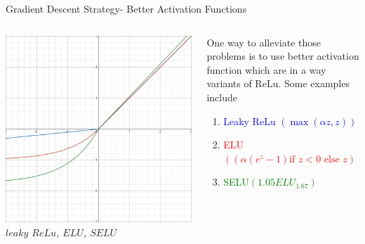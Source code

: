 \begin{frame}{Gradient Descent Strategy- Better Activation Functions}
	\begin{columns}[T]
        \begin{column}{0.5\textwidth}
        	\includegraphics[width=\textwidth]{images/SELU.png}
        	\tiny{\textit{$leaky$ $ReLu$, $ELU$, $SELU$}}
        \end{column}
	    \begin{column}{0.5\textwidth}
    	    One way to alleviate those problems is to use better activation function which are in a way variants of ReLu. Some examples include 
			\begin{enumerate}[$\bullet$]
				\item \textcolor{blue}{Leaky ReLu $\left(\max(\alpha z,z)\right)$}
				\item \textcolor{red}{ELU$\left((\alpha (e^z-1)\text{if $z<0$ else }z)\right)$} 
				\item \textcolor{green}{SELU$\left(1.05ELU_{1.67}\right)$}
			\end{enumerate}
    	\end{column}
    \end{columns}
\end{frame}

